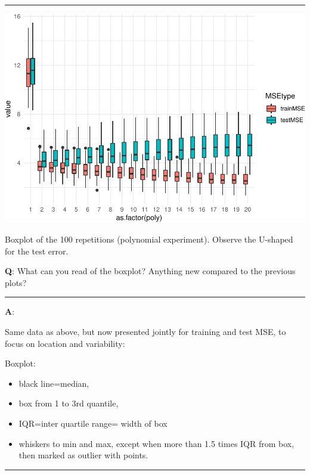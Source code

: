 \documentclass[]{article}
\providecommand{\tightlist}{%
  \setlength{\itemsep}{0pt}\setlength{\parskip}{0pt}}
\begin{document}
\begin{center}\rule{0.5\linewidth}{\linethickness}\end{center}

\includegraphics{2StatLearn_files/figure-latex/unnamed-chunk-2-1.pdf}

Boxplot of the 100 repetitions (polynomial experiment). Observe the
U-shaped for the test error.

\textbf{Q}: What can you read of the boxplot? Anything new compared to
the previous plots?

\begin{center}\rule{0.5\linewidth}{\linethickness}\end{center}

\textbf{A}:

Same data as above, but now presented jointly for training and test MSE,
to focus on location and variability:

Boxplot:

\begin{itemize}
\tightlist
\item
  black line=median,
\item
  box from 1 to 3rd quantile,
\item
  IQR=inter quartile range= width of box
\item
  whiskers to min and max, except when more than 1.5 times IQR from box,
  then marked as outlier with points.
\end{itemize}

\begin{center}\rule{0.5\linewidth}{\linethickness}\end{center}
\end{document}
